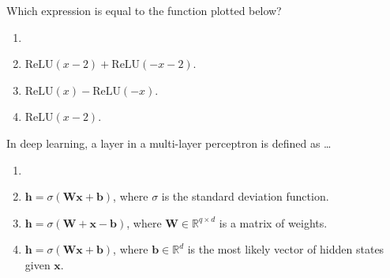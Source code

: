 \documentclass[11pt, a4paper]{exam}
\newcommand{\ReLU}{\mathrm{ReLU}}
\begin{document}
\begin{quiz}
    \item Which expression is equal to the function plotted below?
    \begin{center}
    \end{center}
    \begin{enumerate}[label=$\bigcirc$]
        \item \correct{$\ReLU(x - 2) - \ReLU(-x - 2)$.}
        \item $\ReLU(x - 2) + \ReLU(-x - 2)$.
        \item $\ReLU(x) - \ReLU(-x)$.
        \item $\ReLU(x - 2)$.
    \end{enumerate}

    \item In deep learning, a layer in a multi-layer perceptron is defined as \ldots
    \begin{enumerate}[label=$\bigcirc$]
        \item {}
        \item $\mathbf{h} = \sigma(\mathbf{W}\mathbf{x} + \mathbf{b})$, where $\sigma$ is the standard deviation function.
        \item $\mathbf{h} = \sigma(\mathbf{W} + \mathbf{x} - \mathbf{b})$, where $\mathbf{W} \in \mathbb{R}^{q \times d}$ is a matrix of weights.
        \item $\mathbf{h} = \sigma(\mathbf{W}\mathbf{x} + \mathbf{b})$, where $\mathbf{b} \in \mathbb{R}^d$ is the most likely vector of hidden states given $\mathbf{x}$.
    \end{enumerate}


\end{quiz}
\end{document}

